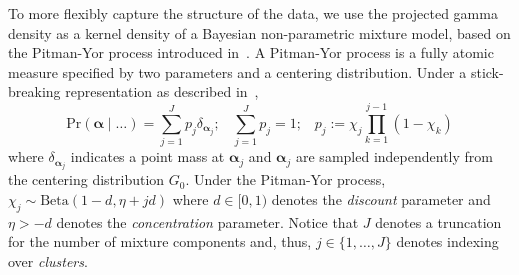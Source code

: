 To more flexibly capture the structure of the data, we use the projected gamma density 
    as a kernel density of a Bayesian non-parametric mixture model, based on 
    the Pitman-Yor process introduced in~\cite{perman1992}.  A Pitman-Yor process
    is a fully atomic measure specified by two parameters and a centering
    distribution.  Under a stick-breaking representation as described 
    in~\cite{ishwaran2001}, 
    \begin{equation}
        \label{eqn:stickbreak}
        \text{Pr}(\bm{\alpha}\mid\ldots) 
            = \sum_{j = 1}^Jp_j\delta_{\bm{\alpha}_j};\;\;\;
            \sum_{j=1}^Jp_j = 1;\;\;\;
            p_j := \chi_j\prod_{k = 1}^{j-1}(1 - \chi_k)
    \end{equation}
    where $\delta_{\bm{\alpha}_j}$ indicates a point mass at $\bm{\alpha}_j$ and
    $\bm{\alpha}_j$ are sampled independently from the centering distribution $G_0$.
    Under the Pitman-Yor process, $\chi_j \sim \text{Beta}(1 - d, \eta + jd)$
    where $d \in [0, 1)$ denotes the \emph{discount} parameter and $\eta > -d$
    denotes the \emph{concentration} parameter. Notice that $J$ denotes a
    truncation for the number of mixture components and, thus, $j\in \lbrace 1,\ldots,J\rbrace$ 
    denotes indexing over \emph{clusters}.

